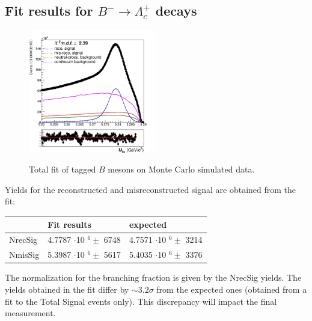 \subsection{Fit results for $B^- \rightarrow \Lambda_c^+$ decays}  


\begin{figure}[H]
    \centering
    {\includegraphics[width=0.50\textwidth]{05-BtagFit/figs/NEW_stream5_chargedBtag_Total_fit_sigmaCB_misReco_Tail_free_370bins.png}}
    \caption{Total fit of tagged $B$ mesons on Monte Carlo simulated data.}
    \label{fig:chargedCorrLambdaC_BtagFit}
    \end{figure}
    \vspace{1.5cm} 

Yields for the reconstructed and misreconstructed signal are obtained from the fit:\\
\vspace{0.25 cm}

\begin{tabular}{ |p{2.5cm}||p{4.2cm}| p{4.2cm}|  }
 \hline
          &    Fit results                 &  expected\\
 \hline
 NrecSig  & 4.7787 $\cdot$10 $^6 \pm$ 6748 &  4.7571 $\cdot$10 $^6 \pm$ 3214 \\
 NmisSig &  5.3987 $\cdot$10 $^6 \pm$ 5617 & 5.4035 $\cdot$10 $^6 \pm$ 3376 \\
 \hline
\end{tabular}

\vspace{0.5 cm}
The normalization for the branching fraction is given by the NrecSig yields. The yields obtained in the fit differ by $\sim 3.2 \sigma$ 
from the expected ones (obtained from a fit to the Total Signal events only).  This discrepancy will impact the final 
measurement.

 
